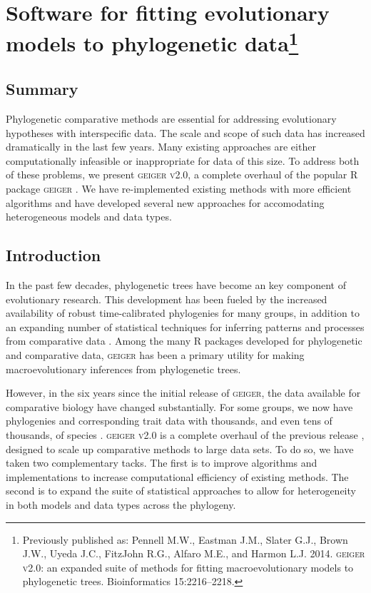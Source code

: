 \chapter[Software for fitting evolutionary models to phylogenetic data]{Software for fitting evolutionary models to phylogenetic data\footnote{Previously published as: Pennell M.W., Eastman J.M., Slater G.J., Brown J.W., Uyeda J.C., FitzJohn R.G., Alfaro M.E., and Harmon L.J. 2014.
  \textsc{geiger v2.0}: an expanded suite of methods for fitting macroevolutionary
  models to phylogenetic trees. Bioinformatics 15:2216--2218.}} 
\label{chap:geiger}

\section{Summary}
Phylogenetic comparative methods are essential for addressing evolutionary hypotheses with interspecific data. The scale and scope of such data has increased dramatically in the last few years. Many existing approaches are either computationally infeasible or inappropriate for data of this size. To address both of these problems, we present \textsc{geiger v2.0}, a complete overhaul of the popular R package \textsc{geiger} \citep{Harmon2008}. We have re-implemented existing methods with more efficient algorithms and have developed several new approaches for accomodating heterogeneous models and data types.  


\section{Introduction}

In the past few decades, phylogenetic trees have become an key component of evolutionary research. This development has been fueled by the increased availability of robust time-calibrated phylogenies for many groups, in addition to an expanding number of statistical techniques for inferring patterns and processes from comparative data \citep[reviewed in][]{PennellHarmon}. Among the many R packages developed for phylogenetic and comparative data, \textsc{geiger} \citep{Harmon2008} has been a primary utility for making macroevolutionary inferences from phylogenetic trees. 

However, in the six years since the initial release of \textsc{geiger}, the data available for comparative biology have changed substantially. For some groups, we now have phylogenies and corresponding trait data with thousands, and even tens of thousands, of species \citep[e.g.,][]{Jetz2012, Rabosky2012, PyronBurbrink2013, ksi,Zanne}. \textsc{geiger v2.0} is a complete overhaul of the previous release \citep{Harmon2008}, designed to scale up comparative methods to large data sets. To do so,  we have taken two complementary tacks. The first is to improve algorithms and implementations to increase computational efficiency of existing methods. The second is to expand the suite of statistical approaches to allow for heterogeneity in both models and data types across the phylogeny.  

